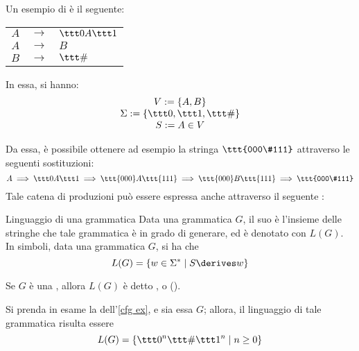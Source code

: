 \documentclass[a4paper, 12pt]{report}
\begin{document}
    \begin{example}[\CFG]
        \label{cfg ex}
        Un esempio di \CFG è il seguente:

        \begin{center}
            \begin{tabular}{rcl}
                $A$ & $\to$ & $\ttt 0 A \ttt 1$ \\
                $A$ & $\to$ & $B$ \\
                $B$ & $\to$ & $\ttt \#$
            \end{tabular}
        \end{center}

        In essa, si hanno: $$\left . \begin{array}{c} V := \{A, B\} \\ \Sigma := \{\ttt 0, \ttt 1, \ttt \# \} \\ S := A \in V \end{array} \right. $$

        Da essa, è possibile ottenere ad esempio la stringa $\ttt{000\#111}$ attraverso le seguenti sostituzioni: $$A \implies \ttt 0 A \ttt 1 \implies \ttt{000}A\ttt{111} \implies \ttt{000}B\ttt{111} \implies \ttt{000\#111}$$ Tale catena di produzioni può essere espressa anche attraverso il seguente :

    \end{example}

    \begin{frameddefn}{Linguaggio di una grammatica}
        Data una grammatica $G$, il suo  è l'insieme delle stringhe che tale grammatica è in grado di generare, ed è denotato con $L(G)$. In simboli, data una grammatica $G$, si ha che $$L(G) = \{w \in \Sigma ^* \mid S \derives w\}$$
    \end{frameddefn}

    \begin{frameddefn}{\CFL}
        Se $G$ è una \CFG, allora $L(G)$ è detto , o \CFL ().
    \end{frameddefn}

    \begin{example}[\CFL]
        Si prenda in esame la \CFG dell'\cref{cfg ex}, e sia essa $G$; allora, il linguaggio di tale grammatica risulta essere $$L(G) = \{\ttt 0 ^n \ttt \# \ttt 1 ^n \mid n \ge 0\}$$
    \end{example}
\end{document}
